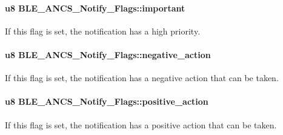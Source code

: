 \paragraph[{\texorpdfstring{important}{important}}]{\setlength{\rightskip}{0pt plus 5cm}u8 B\+L\+E\+\_\+\+A\+N\+C\+S\+\_\+\+Notify\+\_\+\+Flags\+::important}\hypertarget{struct_b_l_e___a_n_c_s___notify___flags_a209c6873ff8d2bae138181b645532265}{}\label{struct_b_l_e___a_n_c_s___notify___flags_a209c6873ff8d2bae138181b645532265}
If this flag is set, the notification has a high priority. 
\paragraph[{\texorpdfstring{negative\+\_\+action}{negative_action}}]{\setlength{\rightskip}{0pt plus 5cm}u8 B\+L\+E\+\_\+\+A\+N\+C\+S\+\_\+\+Notify\+\_\+\+Flags\+::negative\+\_\+action}\hypertarget{struct_b_l_e___a_n_c_s___notify___flags_aa7d76d1a64de63a4c9d2c29bb951fa9f}{}\label{struct_b_l_e___a_n_c_s___notify___flags_aa7d76d1a64de63a4c9d2c29bb951fa9f}
If this flag is set, the notification has a negative action that can be taken. 
\paragraph[{\texorpdfstring{positive\+\_\+action}{positive_action}}]{\setlength{\rightskip}{0pt plus 5cm}u8 B\+L\+E\+\_\+\+A\+N\+C\+S\+\_\+\+Notify\+\_\+\+Flags\+::positive\+\_\+action}\hypertarget{struct_b_l_e___a_n_c_s___notify___flags_a1f24b78d8655ce8af02364392eb68c22}{}\label{struct_b_l_e___a_n_c_s___notify___flags_a1f24b78d8655ce8af02364392eb68c22}
If this flag is set, the notification has a positive action that can be taken. 
